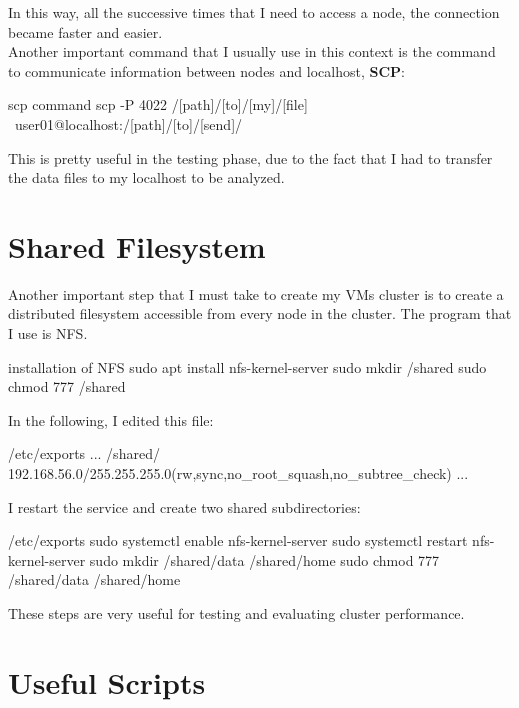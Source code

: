 In this way, all the successive times that I need to access a node, the connection became faster and easier. \\
Another important command that I usually use in this context is the command to communicate information between nodes and localhost, \textbf{SCP}:

\begin{codice}[style=bashstyle]{scp command}
    scp -P 4022 /[path]/[to]/[my]/[file] \
    user01@localhost:/[path]/[to]/[send]/
\end{codice}

This is pretty useful in the testing phase, due to the fact that I had to transfer the data files to my localhost to be analyzed.

\section{Shared Filesystem}

Another important step that I must take to create my VMs cluster is to create a distributed filesystem accessible from every node in the cluster.
The program that I use is NFS.

\begin{codice}[style=bashstyle]{installation of NFS}
    sudo apt install nfs-kernel-server
    sudo mkdir /shared
    sudo chmod 777 /shared
\end{codice}

In the following, I edited this file:

\begin{codice}[style=bashstyle]{/etc/exports}
    ...
    /shared/  192.168.56.0/255.255.255.0(rw,sync,no_root_squash,no_subtree_check)
    ...
\end{codice}

I restart the service and create two shared subdirectories:

\begin{codice}[style=bashstyle]{/etc/exports}
    sudo systemctl enable nfs-kernel-server
    sudo systemctl restart nfs-kernel-server
    sudo mkdir /shared/data /shared/home
    sudo chmod 777  /shared/data /shared/home
\end{codice}

These steps are very useful for testing and evaluating cluster performance.

\section{Useful Scripts}

